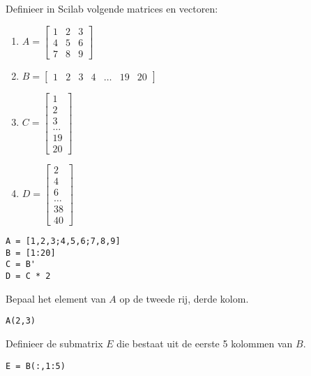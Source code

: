 \begin{oef}
Definieer in Scilab volgende matrices en vectoren:
\begin{enumerate}
  \item $\displaystyle A=\begin{bmatrix}1&2&3\\4&5&6\\7&8&9\end{bmatrix}$
  \item $B=\begin{bmatrix}1&2&3&4&\ldots&19&20\end{bmatrix}$
  \item $C=\begin{bmatrix}1\\2\\3\\ \ldots \\19\\20\end{bmatrix}$
  \item $D=\begin{bmatrix}2\\4\\6\\\ldots\\38\\40\end{bmatrix}$
\end{enumerate}
\begin{opl}
\begin{lstlisting}
A = [1,2,3;4,5,6;7,8,9]
B = [1:20]
C = B'
D = C * 2
\end{lstlisting}
\end{opl}
\end{oef}


\begin{oef}
Bepaal het element van $A$ op de tweede rij, derde kolom.
\begin{opl}
\begin{lstlisting}
A(2,3)
\end{lstlisting}
\end{opl}
\end{oef}

\begin{oef}
Definieer de submatrix $E$ die bestaat uit de eerste 5 kolommen van $B$.
\begin{opl}
\begin{lstlisting}
E = B(:,1:5)
\end{lstlisting}
\end{opl}
\end{oef}

